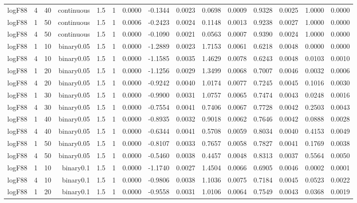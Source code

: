\begin{longtable}{rrrrrrrrrrrrrrr}
  logF88 & 4 & 40 & continuous & 1.5 & 1 & 0.0000 & -0.1344 & 0.0023 & 0.0698 & 0.0009 & 0.9328 & 0.0025 & 1.0000 & 0.0000 \\ 
  logF88 & 1 & 50 & continuous & 1.5 & 1 & 0.0006 & -0.2423 & 0.0024 & 0.1148 & 0.0013 & 0.9238 & 0.0027 & 1.0000 & 0.0000 \\ 
  logF88 & 4 & 50 & continuous & 1.5 & 1 & 0.0000 & -0.1090 & 0.0021 & 0.0563 & 0.0007 & 0.9390 & 0.0024 & 1.0000 & 0.0000 \\ 
  logF88 & 1 & 10 & binary0.05 & 1.5 & 1 & 0.0000 & -1.2889 & 0.0023 & 1.7153 & 0.0061 & 0.6218 & 0.0048 & 0.0000 & 0.0000 \\ 
  logF88 & 4 & 10 & binary0.05 & 1.5 & 1 & 0.0000 & -1.1585 & 0.0035 & 1.4629 & 0.0078 & 0.6243 & 0.0048 & 0.0103 & 0.0010 \\ 
  logF88 & 1 & 20 & binary0.05 & 1.5 & 1 & 0.0000 & -1.1256 & 0.0029 & 1.3499 & 0.0068 & 0.7007 & 0.0046 & 0.0032 & 0.0006 \\ 
  logF88 & 4 & 20 & binary0.05 & 1.5 & 1 & 0.0000 & -0.9242 & 0.0040 & 1.0174 & 0.0077 & 0.7245 & 0.0045 & 0.1016 & 0.0030 \\ 
  logF88 & 1 & 30 & binary0.05 & 1.5 & 1 & 0.0000 & -0.9900 & 0.0031 & 1.0757 & 0.0065 & 0.7474 & 0.0043 & 0.0248 & 0.0016 \\ 
  logF88 & 4 & 30 & binary0.05 & 1.5 & 1 & 0.0000 & -0.7554 & 0.0041 & 0.7406 & 0.0067 & 0.7728 & 0.0042 & 0.2503 & 0.0043 \\ 
  logF88 & 1 & 40 & binary0.05 & 1.5 & 1 & 0.0000 & -0.8935 & 0.0032 & 0.9018 & 0.0062 & 0.7646 & 0.0042 & 0.0888 & 0.0028 \\ 
  logF88 & 4 & 40 & binary0.05 & 1.5 & 1 & 0.0000 & -0.6344 & 0.0041 & 0.5708 & 0.0059 & 0.8034 & 0.0040 & 0.4153 & 0.0049 \\ 
  logF88 & 1 & 50 & binary0.05 & 1.5 & 1 & 0.0000 & -0.8107 & 0.0033 & 0.7657 & 0.0058 & 0.7827 & 0.0041 & 0.1769 & 0.0038 \\ 
  logF88 & 4 & 50 & binary0.05 & 1.5 & 1 & 0.0000 & -0.5460 & 0.0038 & 0.4457 & 0.0048 & 0.8313 & 0.0037 & 0.5564 & 0.0050 \\ 
  logF88 & 1 & 10 & binary0.1 & 1.5 & 1 & 0.0000 & -1.1740 & 0.0027 & 1.4504 & 0.0066 & 0.6905 & 0.0046 & 0.0002 & 0.0001 \\ 
  logF88 & 4 & 10 & binary0.1 & 1.5 & 1 & 0.0000 & -0.9806 & 0.0038 & 1.1036 & 0.0075 & 0.7184 & 0.0045 & 0.0523 & 0.0022 \\ 
  logF88 & 1 & 20 & binary0.1 & 1.5 & 1 & 0.0000 & -0.9558 & 0.0031 & 1.0106 & 0.0064 & 0.7549 & 0.0043 & 0.0368 & 0.0019 \\ 

\end{longtable}
